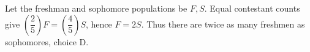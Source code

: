 Let the freshman and sophomore populations be $F,S$. Equal contestant counts give $(\dfrac{2}{5})F=(\dfrac{4}{5})S$, hence $F=2S$. Thus there are twice as many freshmen as sophomores, $\boxed{\text{choice D}}$.

